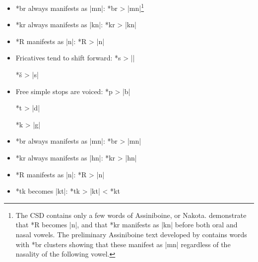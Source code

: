 \documentclass[output=paper]{LSP/langsci}
\begin{document}
 
 \begin{itemize}
 \item  *br always manifests as |mn|:     \hspace{1.5em}  *br       >          |mn|\footnote{The CSD contains only a few words of Assiniboine, or Nakota.  \citet{ParksDeMallie1992} demonstrate that *R becomes |n|, and that *kr manifests as |kn| before both oral and nasal vowels.  The preliminary Assiniboine text developed by \citet{Shields2012} contains words with *br clusters showing that these manifest as |mn| regardless of the nasality of the following vowel.}
 \item *kr always manifests as |kn|:       \hspace{1.6em}        *kr       >          |kn|
 \item *R manifests as |n|: \hspace{5.3em} *R	>	|n|
 \end{itemize}
  
 
 \begin{itemize}
 \item Fricatives tend to shift forward:  \hspace{.7em}   *s         >          ||

\hspace{13.6em}      *š         >          |s|

\item Free simple stops are voiced:  \hspace{1.6em}   *p        >          |b|

\hspace{13.6em}      *t         >          |d|

\hspace{13.6em}       *k        >          |g|

\item *br always manifests as |mn|: \hspace{1.6em}    *br       >          |mn|

\item *kr always manifests as |hn|:  \hspace{1.7em}   *kr       >          |hn|

\item *R manifests as |n|:  \hspace{6em}     *R       >          |n|

 \item *tk becomes |kt|:  \hspace{7em}      *tk       >          |kt|       <          *kt
 \end{itemize}
 
\end{document}
